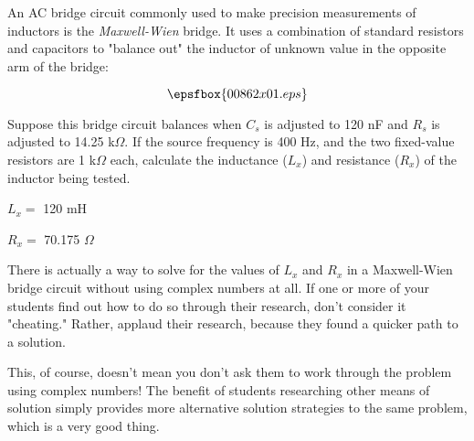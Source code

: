 

An AC bridge circuit commonly used to make precision measurements of inductors is the {\it Maxwell-Wien} bridge.  It uses a combination of standard resistors and capacitors to "balance out" the inductor of unknown value in the opposite arm of the bridge:

$$\epsfbox{00862x01.eps}$$

Suppose this bridge circuit balances when $C_s$ is adjusted to 120 nF and $R_s$ is adjusted to 14.25 k$\Omega$.  If the source frequency is 400 Hz, and the two fixed-value resistors are 1 k$\Omega$ each, calculate the inductance ($L_x$) and resistance ($R_x$) of the inductor being tested.







$L_x =$ 120 mH

$R_x =$ 70.175 $\Omega$







There is actually a way to solve for the values of $L_x$ and $R_x$ in a Maxwell-Wien bridge circuit without using complex numbers at all.  If one or more of your students find out how to do so through their research, don't consider it "cheating."  Rather, applaud their research, because they found a quicker path to a solution.

This, of course, doesn't mean you don't ask them to work through the problem using complex numbers!  The benefit of students researching other means of solution simply provides more alternative solution strategies to the same problem, which is a very good thing.




